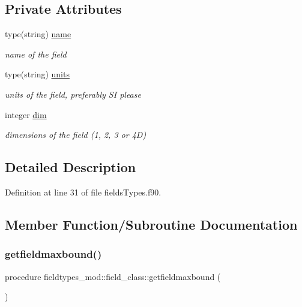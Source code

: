 \subsection*{Private Attributes}
\begin{DoxyCompactItemize}
\item 
type(string) \mbox{\hyperlink{structfieldtypes__mod_1_1field__class_a0482789d206fc831b81c99daa17069d3}{name}}
\begin{DoxyCompactList}\small\item\em name of the field \end{DoxyCompactList}\item 
type(string) \mbox{\hyperlink{structfieldtypes__mod_1_1field__class_abd4cf1204fbe4f2d174dd81230511077}{units}}
\begin{DoxyCompactList}\small\item\em units of the field, preferably SI please \end{DoxyCompactList}\item 
integer \mbox{\hyperlink{structfieldtypes__mod_1_1field__class_a46ac561c9acc61595c7e15d30a56794e}{dim}}
\begin{DoxyCompactList}\small\item\em dimensions of the field (1, 2, 3 or 4D) \end{DoxyCompactList}\end{DoxyCompactItemize}


\subsection{Detailed Description}


Definition at line 31 of file fields\+Types.\+f90.



\subsection{Member Function/\+Subroutine Documentation}
\mbox{\label{structfieldtypes__mod_1_1field__class_a8275318f997672a2933ff6bbdcffa521}} 
\subsubsection{\texorpdfstring{getfieldmaxbound()}{getfieldmaxbound()}}
{\footnotesize\ttfamily procedure fieldtypes\+\_\+mod\+::field\+\_\+class\+::getfieldmaxbound (\begin{DoxyParamCaption}{ }\end{DoxyParamCaption})\hspace{0.3cm}{\ttfamily [private]}}



